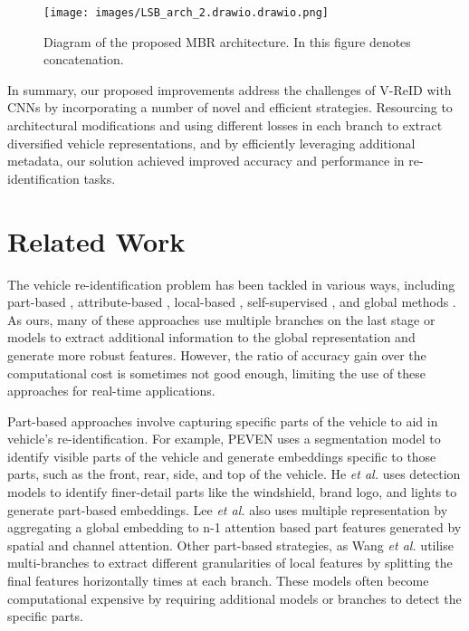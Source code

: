\documentclass[letterpaper, 10pt, conference]{ieeeconf}
\begin{document}
\begin{figure*}[hbt!]
\centerline{{\texttt{[image: images/LSB\_arch\_2.drawio.drawio.png]}}}
\caption{Diagram of the proposed MBR architecture. In this figure  denotes concatenation.} 
\label{fig:diagrama}
\end{figure*}

In summary, our proposed improvements address the challenges of V-ReID with CNNs by incorporating a number of novel and efficient strategies. Resourcing to architectural modifications and using different losses in each branch to extract diversified vehicle representations, and by efficiently leveraging additional metadata, our solution achieved improved accuracy and performance in re-identification tasks.
\section{Related Work}
The vehicle re-identification problem has been tackled in various ways, including part-based \cite{meng2020parsing, he2019part, lee2022multiple, suprem2020looking}, attribute-based \cite{quispe2021attributenet, sun2020CFVMNet, article}, local-based \cite{wang2018learning}, self-supervised \cite{khorramshahi2020devil, khorramshahi2022scalable, li2021self}, and global methods \cite{he2021transreid, zhao2021heterogeneous, he2020fastreid}. As ours, many of these approaches use multiple branches on the last stage or models to extract additional information to the global representation and generate more robust features. However, the ratio of accuracy gain over the computational cost is sometimes not good enough, limiting the use of these approaches for real-time applications.


Part-based approaches involve capturing specific parts of the vehicle to aid in vehicle's re-identification. For example, PEVEN \cite{meng2020parsing} uses a segmentation model to identify visible parts of the vehicle and generate embeddings specific to those parts, such as the front, rear, side, and top of the vehicle. He \textit{et al.} \cite{he2019part} uses detection models to identify finer-detail parts like the windshield, brand logo, and lights to generate part-based embeddings. Lee \textit{et al.} \cite{lee2022multiple} also uses multiple representation by aggregating a global embedding to n-1 attention based part features generated by spatial and channel attention. 
Other part-based strategies, as Wang \textit{et al.} \cite{wang2018learning} utilise multi-branches to extract different granularities of local features by splitting the final features horizontally  times at each branch. These models often become computational expensive by requiring additional models or branches to detect the specific parts.  
\end{document}
